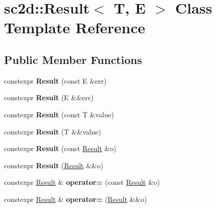 \hypertarget{classsc2d_1_1Result}{}\section{sc2d\+:\+:Result$<$ T, E $>$ Class Template Reference}
\label{classsc2d_1_1Result}
\subsection*{Public Member Functions}
\begin{DoxyCompactItemize}
\item 
\mbox{\label{classsc2d_1_1Result_ae9e62244455bedadeafed1720ae0e7d7}} 
constexpr {\bfseries Result} (const E \&err)
\item 
\mbox{\label{classsc2d_1_1Result_ad3c17196336b973fd271c4759bd27289}} 
constexpr {\bfseries Result} (E \&\&err)
\item 
\mbox{\label{classsc2d_1_1Result_a39371e29d9a428fa2fd0eb5335ffe0d9}} 
constexpr {\bfseries Result} (const T \&value)
\item 
\mbox{\label{classsc2d_1_1Result_ac7dcc532d979dbf9aecf3190107c0a6c}} 
constexpr {\bfseries Result} (T \&\&value)
\item 
\mbox{\label{classsc2d_1_1Result_aab25f940b1b459720ae0deaf185a74bf}} 
constexpr {\bfseries Result} (const \hyperlink{classsc2d_1_1Result}{Result} \&o)
\item 
\mbox{\label{classsc2d_1_1Result_a170808841b5545b3e1d81fbafbb2098b}} 
constexpr {\bfseries Result} (\hyperlink{classsc2d_1_1Result}{Result} \&\&o)
\item 
\mbox{\label{classsc2d_1_1Result_ac76a138b6bf2b49dab8b7abdc32f5d24}} 
constexpr \hyperlink{classsc2d_1_1Result}{Result} \& {\bfseries operator=} (const \hyperlink{classsc2d_1_1Result}{Result} \&o)
\item 
\mbox{\label{classsc2d_1_1Result_ac54c2e911d9f7af4060ec003d0e47b22}} 
constexpr \hyperlink{classsc2d_1_1Result}{Result} \& {\bfseries operator=} (\hyperlink{classsc2d_1_1Result}{Result} \&\&o)

\end{DoxyCompactItemize}
